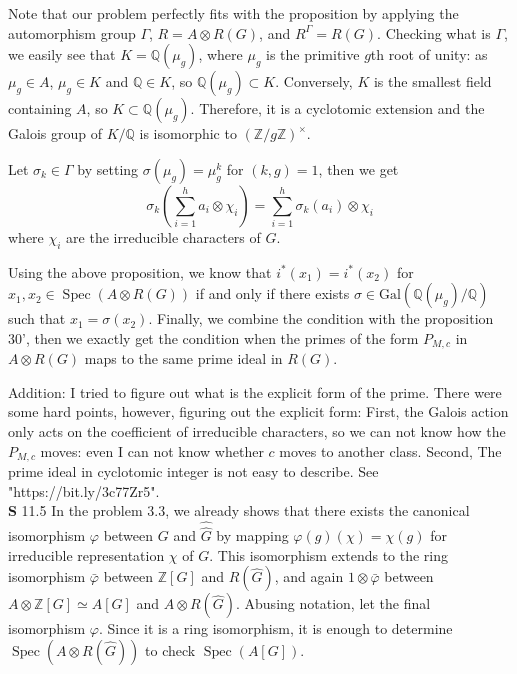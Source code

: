 \documentclass[a4paper, 12pt]{article}
\theoremstyle{Mydefinition}
\theoremstyle{Mytheorem}
\DeclareMathOperator{\Spec}{Spec}
\begin{document}
Note that our problem perfectly fits with the proposition by applying the automorphism group $\Gamma$, $R = A\otimes R(G)$, and $R^{\Gamma} = R(G)$. Checking what is $\Gamma$, we easily see that $K = \mathbb{Q}(\mu_g)$, where $\mu_g$ is the primitive $g$th root of unity: as $\mu_g\in A$, $\mu_g\in K$ and $\mathbb{Q}\in K$, so $\mathbb{Q}(\mu_g)\subset K$. Conversely, $K$ is the smallest field containing $A$, so $K\subset \mathbb{Q}(\mu_g)$. Therefore, it is a cyclotomic extension and the Galois group of $K/\mathbb{Q}$ is isomorphic to $(\mathbb{Z}/g\mathbb{Z})^\times$.

Let $\sigma_k\in \Gamma$ by setting $\sigma(\mu_g) = \mu_g^k$ for $(k,g)=1$, then we get
\begin{equation}
    \sigma_k\left(\sum_{i=1}^h a_i\otimes \chi_i\right) = \sum_{i=1}^h \sigma_k(a_i)\otimes \chi_i
\end{equation}
where $\chi_i$ are the irreducible characters of $G$.

Using the above proposition, we know that $i^*(x_1)=i^*(x_2)$ for $x_1,x_2\in \Spec(A\otimes R(G))$ if and only if there exists $\sigma\in \mathrm{Gal}(\mathbb{Q}(\mu_g)/\mathbb{Q})$ such that $x_1 = \sigma(x_2)$. Finally, we combine the condition with the proposition 30', then we exactly get the condition when the primes of the form $P_{M,c}$ in $A\otimes R(G)$ maps to the same prime ideal in $R(G)$.

Addition: I tried to figure out what is the explicit form of the prime. There were some hard points, however, figuring out the explicit form: First, the Galois action only acts on the coefficient of irreducible characters, so we can not know how the $P_{M,c}$ moves: even I can not know whether $c$ moves to another class. Second, The prime ideal in cyclotomic integer is not easy to describe. See "https://bit.ly/3c77Zr5".\\

\noindent \textbf{S} 11.5
In the problem 3.3, we already shows that there exists the canonical isomorphism $\varphi$ between $G$ and $\hat{\hat{G}}$ by mapping $\varphi(g)(\chi) = \chi(g)$ for irreducible representation $\chi$ of $G$. This isomorphism extends to the ring isomorphism $\bar{\varphi}$ between $\mathbb{Z}[G]$ and $R(\hat{G})$, and again $1\otimes \bar{\varphi}$ between $A\otimes \mathbb{Z}[G]\simeq A[G]$ and $A\otimes R(\hat{G})$. Abusing notation, let the final isomorphism $\varphi$. Since it is a ring isomorphism, it is enough to determine $\Spec(A\otimes R(\hat{G}))$ to check $\Spec(A[G])$.
\end{document}
